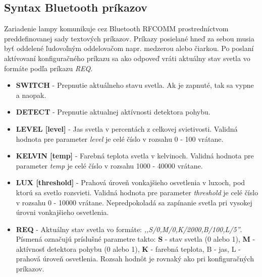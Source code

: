 \documentclass[12pt, a4paper]{article}
\begin{document}
\subsection{Syntax Bluetooth príkazov}
Zariadenie lampy komunikuje cez Bluetooth RFCOMM prostredníctvom preddefinovanej sady textových príkazov. Príkazy posielané hneď za sebou musia byť oddelené ľudovoľným oddelovačom napr. medzerou alebo čiarkou. Po poslaní aktívovaní konfiguračného príkazu sa ako odpoveď vráti aktuálny stav svetla vo formáte podľa príkazu \emph{REQ}.
\begin{itemize}
\item \textbf{SWITCH} - Prepnutie aktuálneho stavu svetla. Ak je zapnuté, tak sa vypne a naopak.
\item \textbf{DETECT} - Prepnutie aktualnej aktívnosti detektora pohybu.
\item \textbf{LEVEL [level]} - Jas svetla v percentách z celkovej svietivosti. Validná hodnota pre parameter \emph{level} je celé číslo v rozsahu 0 - 100 vrátane.
\item \textbf{KELVIN [temp]} - Farebná teplota svetla v kelvinoch. Validná hodnota pre parameter \emph{temp} je celé číslo v rozsahu 1000 - 40000 vrátane.
\item \textbf{LUX [threshold]} - Prahová úroveň vonkajšieho osvetlenia v luxoch, pod ktorú sa svetlo rozsvieti. Validná hodnota pre parameter \emph{threshold} je celé číslo v rozsahu 0 - 10000 vrátane. Nepredpokoladá sa zapínanie svetla pri vysokej úrovni vonkajšieho osvetlenia.
\item \textbf{REQ} - Aktuálny stav svetla vo formáte: \emph{,,{S/0,M/0,K/2000,B/100,L/5}''}. Písmená označujú príslušné parametre takto: \textbf{S} - stav svetla (0 alebo 1), \textbf{M} - aktívnosť detektora pohybu  (0 alebo 1), \textbf{K} - farebná teplota, B - jas,  L - prahová úroveň osvetlenia. Rozsah hodnôt je rovnaký ako pri konfiguračných príkazov.
\end{itemize}
\end{document}
